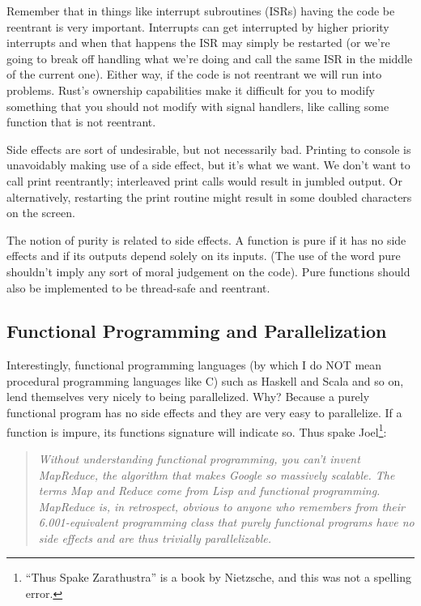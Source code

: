 \documentclass[a4paper]{report}
\begin{document}
Remember that in things like interrupt subroutines (ISRs) having the code be reentrant is very important. Interrupts can get interrupted by higher priority interrupts and when that happens the ISR may simply be restarted (or we're going to break off handling what we're doing and call the same ISR in the middle of the current one). Either way, if the code is not reentrant we will run into problems. Rust's ownership capabilities make it difficult for you to modify something that you should not modify with signal handlers, like calling some function that is not reentrant.

Side effects are sort of undesirable, but not necessarily bad. Printing to console is unavoidably making use of a side effect, but it's what we want. We don't want to call print reentrantly; interleaved print calls would result in jumbled output. Or alternatively, restarting the print routine might result in some doubled characters on the screen.

The notion of purity is related to side effects. A function is pure if it has no side effects and if its outputs depend solely on its inputs. (The use of the word pure shouldn't imply any sort of moral judgement on the code). Pure functions should also be implemented to be thread-safe and reentrant.


\subsection*{Functional Programming and Parallelization}
Interestingly, functional programming languages (by which I do NOT mean procedural programming languages like C) such as Haskell and Scala and so on, lend themselves very nicely to being parallelized. Why? Because a purely functional program has no side effects and they are very easy to parallelize. If a function is impure, its functions signature will indicate so. Thus spake Joel\footnote{``Thus Spake Zarathustra'' is a book by Nietzsche, and this was not a spelling error.}:

\begin{quote}
\textit{Without understanding functional programming, you can't invent MapReduce, the algorithm that makes Google so massively scalable. The terms Map and Reduce come from Lisp and functional programming. MapReduce is, in retrospect, obvious to anyone who remembers from their 6.001-equivalent programming class that purely functional programs have no side effects and are thus trivially parallelizable.}~\cite{joel:functional}
\end{quote}
\end{document}

